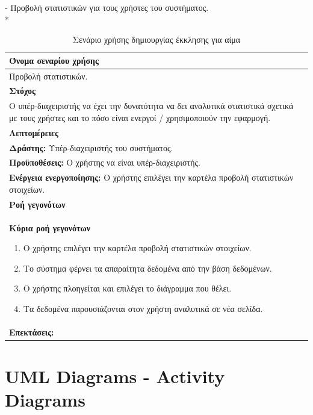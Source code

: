 - Προβολή στατιστικών για τους χρήστες του συστήματος.
\\*		
\begin{table}[H]
	\begin{center}
	    \begin{tabular}{|p{\dimexpr \linewidth-2\tabcolsep}|}
	    \hline
	    \rowcolor{grayy}
	    \textbf{Όνομα σεναρίου χρήσης}
	    \\ \hline    
	    Προβολή στατιστικών.
	     \\ \hline
	    \rowcolor{grayy}
	    \textbf{\textbf{Στόχος}}
	    \\ \hline
	 	 Ο υπέρ-διαχειριστής να έχει την δυνατότητα να δει αναλυτικά στατιστικά σχετικά με τους χρήστες και το πόσο είναι ενεργοί / χρησιμοποιούν την εφαρμογή. 
	    \\ \hline
	    \rowcolor{grayy}
	    \textbf{Λεπτομέρειες}
	    \\ \hline
		\textbf{Δράστης:} Υπέρ-διαχειριστής του συστήματος.
		\\*
		\textbf{Προϋποθέσεις:} Ο χρήστης να είναι υπέρ-διαχειριστής.
		\\*
		\textbf{Ενέργεια ενεργοποίησης:} Ο χρήστης επιλέγει την καρτέλα προβολή στατιστικών στοιχείων.
		\\ \hline
		\rowcolor{grayy}    
	    \textbf{Ροή γεγονότων}
	    \\ \hline
		\textbf{Κύρια ροή γεγονότων}
		\begin{enumerate}
		\item	 Ο χρήστης επιλέγει την καρτέλα προβολή στατιστικών στοιχείων.
		\item Το σύστημα φέρνει τα απαραίτητα δεδομένα από την βάση δεδομένων.
		\item Ο χρήστης πλοηγείται και επιλέγει το διάγραμμα που θέλει.
		\item Τα δεδομένα παρουσιάζονται στον χρήστη αναλυτικά  σε νέα σελίδα.
		\end{enumerate}
		\\ \hline
		\textbf{Επεκτάσεις:}
		   \\ \hline
	    \end{tabular}
	    \caption{Σενάριο χρήσης δημιουργίας έκκλησης για αίμα}
	    \label{tab:view_analytics} 
	\end{center}
\end{table}

\section{UML Diagrams - Activity Diagrams}

